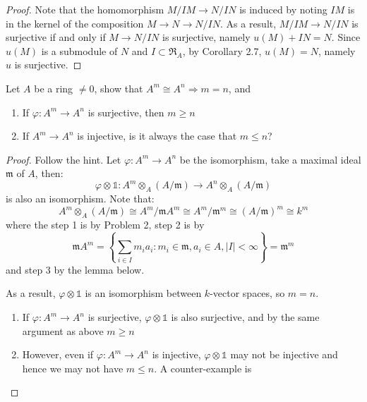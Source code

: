 \documentclass{solution}
\begin{document}
\begin{proof}
    Note that the homomorphism $M / IM \rightarrow N / IN$ is induced by noting $IM$ is in the kernel of the composition $M \rightarrow N \rightarrow N / IN$. As a result, $M / IM \rightarrow N / IN$ is surjective if and only if $M \rightarrow N / IN$ is surjective, namely $u(M) + IN = N$. Since $u(M)$ is a submodule of $N$ and $I \subset \mathfrak{R}_A$, by Corollary 2.7, $u(M) = N$, namely $u$ is surjective.
\end{proof}

\begin{problem}
    Let $A$ be a ring $\ne 0$, show that $A^m \cong A^n \Rightarrow m = n$, and

    \begin{enumerate}
        \item If $\varphi: A^m \rightarrow A^n$ is surjective, then $m \ge n$
        \item If $A^m \rightarrow A^n$ is injective, is it always the case that $m \le n$?
    \end{enumerate}
\end{problem}

\begin{proof}
    Follow the hint. Let $\varphi: A^m \rightarrow A^n$ be the isomorphism, take a maximal ideal $\mathfrak{m}$ of $A$, then:
    $$\varphi \otimes \mathds{1}: A^m \otimes_A (A / \mathfrak{m}) \rightarrow A^n \otimes_A (A / \mathfrak{m})$$
    is also an isomorphism. Note that:
    $$A^m \otimes_A (A / \mathfrak{m}) \cong A^m / \mathfrak{m} A^m \cong A^m / \mathfrak{m}^m \cong (A / \mathfrak{m})^m \cong k^m$$
    where the step 1 is by Problem 2, step 2 is by
    $$\mathfrak{m}A^m = \left\lbrace \sum\limits_{i \in I} m_i a_i: m_i \in \mathfrak{m}, a_i \in A, \left\lvert I \right\rvert \lt \infty \right\rbrace = \mathfrak{m}^m$$
    and step 3 by the lemma below.

    As a result, $\varphi \otimes \mathds{1}$ is an isomorphism between $k$-vector spaces, so $m = n$.

    \begin{enumerate}
        \item If $\varphi: A^m \rightarrow A^n$ is surjective, $\varphi \otimes \mathds{1}$ is also surjective, and by the same argument as above $m \ge n$
        \item However, even if $\varphi: A^m \rightarrow A^n$ is injective, $\varphi \otimes \mathds{1}$ may not be injective and hence we may not have $m \le n$. A counter-example is \TODO
    \end{enumerate}
\end{proof}
\end{document}

